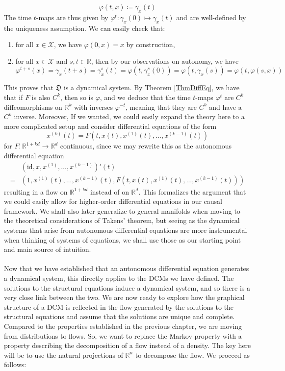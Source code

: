 \documentclass[11pt, a4paper]{memoir}
\theoremstyle{break}
\theoremstyle{break}
\theoremstyle{nonumberplain}
\newcommand{\mR}{\mathbb{R}}
\begin{document}
$$\varphi(t,x)\coloneqq \gamma_x(t)$$
The time $t$-maps are thus given by $\varphi^t:\gamma_x(0)\mapsto \gamma_x(t)$ and are well-defined by the uniqueness assumption. We can easily check that:
\begin{enumerate}[label=(\roman*)]
	\item for all $x\in \mathcal{X}$, we have $\varphi(0,x)=x$ by construction,
	\item for all $x\in \mathcal{X}$ and $s,t\in \mR$, then by our observations on autonomy, we have
	$$\varphi^{t+s}(x)=\gamma_x(t+s)=\gamma_x^s(t)=\varphi(t,\gamma_x^s(0))=\varphi(t,\gamma_x(s))=\varphi(t,\varphi(s,x))$$
\end{enumerate}
This proves that $\mathfrak{D}$ is a dynamical system. By Theorem \ref{ThmDiffEq}, we have that if $F$ is also $C^k$, then so is $\varphi$, and we deduce that the time $t$-maps $\varphi^t$ are $C^k$ diffeomorphisms on $\mR^k$ with inverses $\varphi^{-t}$, meaning that they are $C^k$ and have a $C^k$ inverse. Moreover, If we wanted, we could easily expand the theory here to a more complicated setup and consider differential equations of the form
$$x^{(k)}(t)=F\left(t,x(t),x^{(1)}(t),\ldots, x^{(k-1)}(t)\right)$$
for $F:\mR^{1+kd}\to\mR^d$ continuous, since we may rewrite this as the autonomous differential equation
\begin{align*}
&\left(\text{id},x,x^{(1)},\ldots,x^{(k-1)}\right)'(t)\\
=&\left(1,x^{(1)}(t),\ldots,x^{(k-1)}(t),F\left(t,x(t),x^{(1)}(t),\ldots, x^{(k-1)}(t)\right)\right)
\end{align*}
resulting in a flow on $\mR^{1+kd}$ instead of on $\mR^d$. This formalizes the argument that we could easily allow for higher-order differential equations in our causal framework. We shall also later generalize to general manifolds when moving to the theoretical considerations of Takens' theorem, but seeing as the dynamical systems that arise from autonomous differential equations are more instrumental when thinking of systems of equations, we shall use those as our starting point and main source of intuition.\\\\
Now that we have established that an autonomous differential equation generates a dynamical system, this directly applies to the DCMs we have defined. The solutions to the structural equations induce a dynamical system, and so there is a very close link between the two. We are now ready to explore how the graphical structure of a DCM is reflected in the flow generated by the solutions to the structural equations and assume that the solutions are unique and complete. Compared to the properties established in the previous chapter, we are moving from distributions to flows. So, we want to replace the Markov property with a property describing the decomposition of a flow instead of a density. The key here will be to use the natural projections of $\mR^n$ to decompose the flow. We proceed as follows:\\[5pt]
\end{document}

